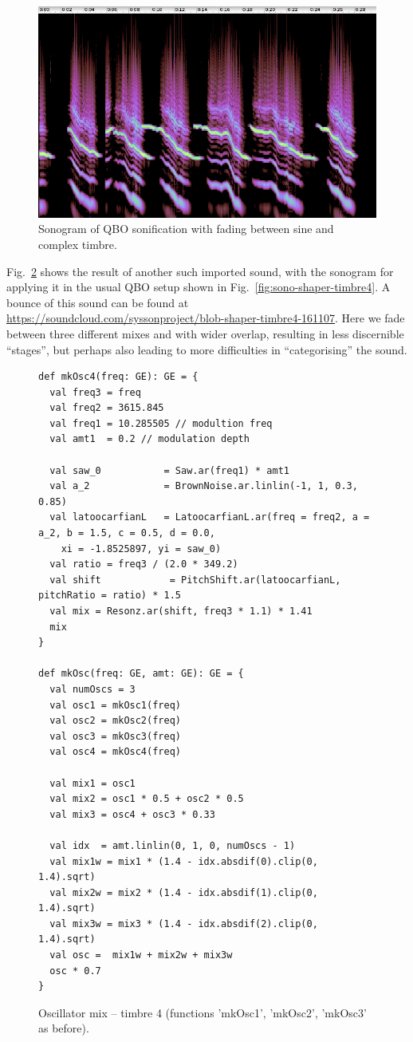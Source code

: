 \documentclass[11pt,a4paper]{article}
\newcommand{\figref}[1]{Fig.~\ref{#1}}
\begin{document}
\begin{figure}
\centering
\includegraphics[width=\textwidth]{figures/blob-shaper-timbre3-161107.png}
\caption{Sonogram of QBO sonification with fading between sine and complex timbre.}
\label{fig:sono-shaper-timbre3}
\end{figure}

\figref{fig:code-shaper-timbre4} shows the result of another such imported sound, with the sonogram for applying it in the usual QBO setup shown in \figref{fig:sono-shaper-timbre4}. A bounce of this sound can be found at \url{https://soundcloud.com/syssonproject/blob-shaper-timbre4-161107}. Here we fade between three different mixes and with wider overlap, resulting in less discernible ``stages'', but perhaps also leading to more difficulties in ``categorising'' the sound.

\begin{figure}[b]
\begin{lstlisting}[style=scala]
def mkOsc4(freq: GE): GE = {
  val freq3 = freq
  val freq2 = 3615.845
  val freq1 = 10.285505 // modultion freq
  val amt1  = 0.2 // modulation depth
   
  val saw_0           = Saw.ar(freq1) * amt1
  val a_2             = BrownNoise.ar.linlin(-1, 1, 0.3, 0.85)
  val latoocarfianL   = LatoocarfianL.ar(freq = freq2, a = a_2, b = 1.5, c = 0.5, d = 0.0,
    xi = -1.8525897, yi = saw_0)
  val ratio = freq3 / (2.0 * 349.2)
  val shift            = PitchShift.ar(latoocarfianL, pitchRatio = ratio) * 1.5
  val mix = Resonz.ar(shift, freq3 * 1.1) * 1.41
  mix
}
  
def mkOsc(freq: GE, amt: GE): GE = {
  val numOscs = 3
  val osc1 = mkOsc1(freq)
  val osc2 = mkOsc2(freq)
  val osc3 = mkOsc3(freq)
  val osc4 = mkOsc4(freq)
  
  val mix1 = osc1
  val mix2 = osc1 * 0.5 + osc2 * 0.5
  val mix3 = osc4 + osc3 * 0.33
  
  val idx  = amt.linlin(0, 1, 0, numOscs - 1)
  val mix1w = mix1 * (1.4 - idx.absdif(0).clip(0, 1.4).sqrt)
  val mix2w = mix2 * (1.4 - idx.absdif(1).clip(0, 1.4).sqrt)
  val mix3w = mix3 * (1.4 - idx.absdif(2).clip(0, 1.4).sqrt)
  val osc =  mix1w + mix2w + mix3w
  osc * 0.7
}
\end{lstlisting}
\caption{Oscillator mix -- timbre 4 (functions 'mkOsc1', 'mkOsc2', 'mkOsc3' as before).}
\label{fig:code-shaper-timbre4}
\end{figure}
\end{document}
